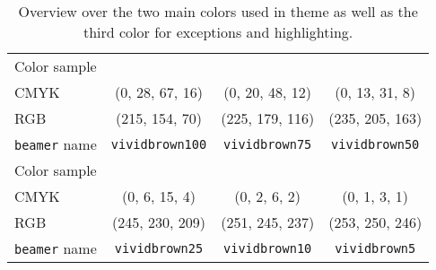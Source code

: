 \begin{table}
\begin{tabulary}{\textwidth}{LCCC}
Color sample &  &  & \\
CMYK & (0, 28, 67, 16) & (0, 20, 48, 12) & (0, 13, 31, 8)\\
RGB  & (215, 154, 70) & (225, 179, 116)  & (235, 205, 163)\\
\texttt{beamer} name & \lstinline!vividbrown100! & \lstinline!vividbrown75! & \lstinline!vividbrown50!\\[3mm]
Color sample &  &  & \\
CMYK & (0, 6, 15, 4) & (0, 2, 6, 2) & (0, 1, 3, 1)\\
RGB  & (245, 230, 209)  & (251, 245, 237) & (253, 250, 246)\\
\texttt{beamer} name & \lstinline!vividbrown25! & \lstinline!vividbrown10! & \lstinline!vividbrown5!\\\bottomrule
\end{tabulary}

\caption{Overview over the two main colors used in theme as well as the third color for exceptions and highlighting.}
\label{table:allcolors}
\end{table}

